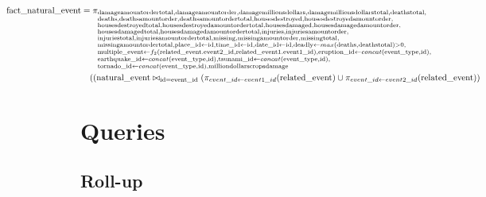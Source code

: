 \documentclass{article}
\begin{document}
\begin{align*}
\hspace{-3.6cm} \text{fact\_natural\_event} &= 
\pi_{\begin{subarray}{l}
   \text{damageamountordertotal}, 
   \text{damageamountorder}, 
   \text{damagemillionsdollars}, 
   \text{damagemillionsdollarstotal}, 
   \text{deathstotal}, \\
   \text{deaths}, 
   \text{deathsamountorder}, 
   \text{deathsamountordertotal}, 
   \text{housesdestroyed}, 
   \text{housesdestroyedamountorder}, \\
   \text{housesdestroyedtotal}, 
   \text{housesdestroyedamountordertotal}, 
   \text{housesdamaged}, 
   \text{housesdamagedamountorder}, \\
   \text{housesdamagedtotal}, 
   \text{housesdamagedamountordertotal}, 
   \text{injuries}, 
   \text{injuriesamountorder}, \\
   \text{injuriestotal}, 
   \text{injuriesamountordertotal}, 
   \text{missing}, 
   \text{missingamountorder}, 
   \text{missingtotal}, \\
   \text{missingamountordertotal}, 
   \text{place\_id} \leftarrow \text{id}, 
   \text{time\_id} \leftarrow \text{id}, 
   \text{date\_id} \leftarrow \text{id}, 
   \text{deadly} \leftarrow max(\text{deaths}, \text{deathstotal})>0, \\
   \text{multiple\_event} \leftarrow f_2(\text{related\_event.event2\_id}, \text{related\_event1.event1\_id}), 
   \text{eruption\_id} \leftarrow concat(\text{event\_type}, \text{id}), \\
   \text{earthquake\_id} \leftarrow concat(\text{event\_type}, \text{id}), 
   \text{tsunami\_id} \leftarrow concat(\text{event\_type}, \text{id}), \\
   \text{tornado\_id} \leftarrow concat(\text{event\_type}, \text{id}), 
   \text{milliondollarscropsdamage}
\end{subarray}} \\
&\quad ((\text{natural\_event} \bowtie_{\text{id} = \text{event\_id}} (\pi_{event\_id \leftarrow event1\_id}(\text{related\_event}) \cup 
\pi_{event\_id \leftarrow event2\_id}(\text{related\_event}))
\end{align*}

\newpage
\section{Queries}

\subsection{Roll-up}
\end{document}
